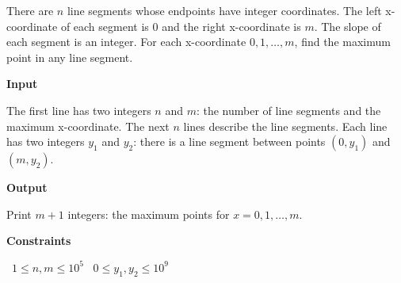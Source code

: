 There are $n$ line segments whose endpoints have integer coordinates. The left x-coordinate of each segment is $0$ and the right x-coordinate is $m$. The slope of each segment is an integer.
For each x-coordinate $0,1,\dots,m$, find the maximum point in any line segment.

\vspace{0.3cm}\noindent\textbf{Input}

The first line has two integers $n$ and $m$: the number of line segments and the maximum x-coordinate.
The next $n$ lines describe the line segments. Each line has two integers $y_1$ and $y_2$: there is a line segment between points $(0,y_1)$ and $(m,y_2)$.

\vspace{0.3cm}\noindent\textbf{Output}

Print $m+1$ integers: the maximum points for $x=0,1,\dots,m$.

\vspace{0.3cm}\noindent\textbf{Constraints}

\textbullet\ $1 \le n, m \le 10^5$
\textbullet\ $0 \le y_1,y_2 \le 10^9$